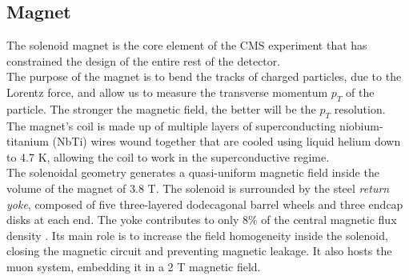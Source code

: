 \subsection{Magnet}
The solenoid magnet \cite{Coroller1997TheReport} is the core element of the CMS experiment that has constrained the design of the entire rest of the detector.\\
The purpose of the magnet is to bend the tracks of charged particles, due to the Lorentz force, and allow us to measure the transverse momentum $p_T$ of the particle. The stronger the magnetic field, the better will be the $p_T$ resolution.\\
The magnet's coil is made up of multiple layers of superconducting niobium-titanium (NbTi) wires wound together that are cooled using liquid helium down to 4.7 K, allowing the coil to work in the superconductive regime.\\
The solenoidal geometry generates a quasi-uniform magnetic field inside the volume of the magnet of 3.8 T.
The solenoid is surrounded by the steel \emph{return yoke}, composed of five three-layered dodecagonal barrel wheels and three endcap disks at each end.  The yoke contributes to only 8\% of the central magnetic flux density \cite{Chatrchyan2010PreciseRays}. Its main role is to increase the field homogeneity inside the solenoid, closing the magnetic circuit and preventing magnetic leakage. It also hosts the muon system, embedding it in a 2 T magnetic field.

